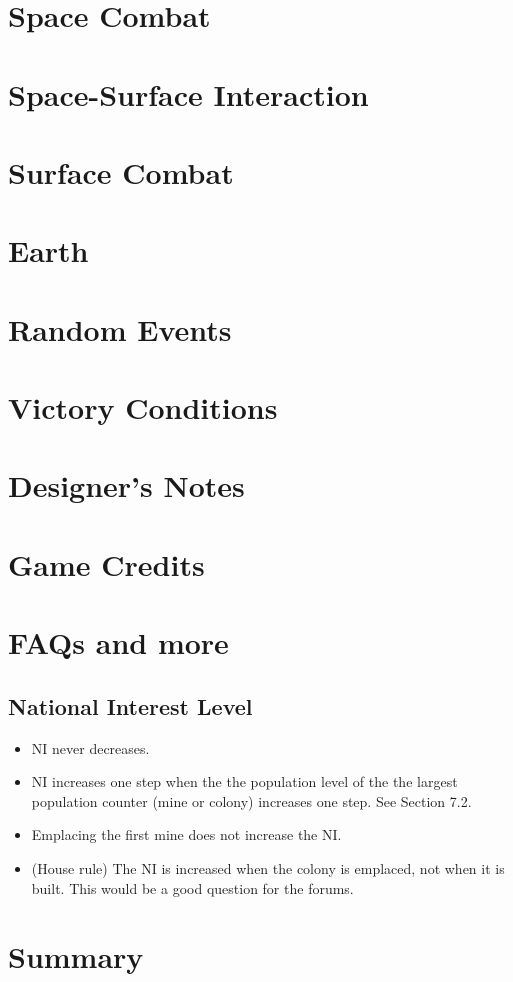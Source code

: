 \documentclass[10pt]{article}
\begin{document}
\begin{multicols}{2}
\section{Space Combat}

\section{Space-Surface Interaction}

\section{Surface Combat}

\section{Earth}

\section{Random Events}

\section{Victory Conditions}

\section{Designer's Notes}

\section{Game Credits}


\section{FAQs and more}

\subsection{National Interest Level}

\begin{itemize}
  \item NI never decreases.
  \item NI increases one step when the the population level of the the largest
    population counter (mine or colony) increases one step. See Section 7.2.
  \item Emplacing the first mine does not increase the NI.
  \item (House rule) The NI is increased when the colony is emplaced, not when
    it is built. This would be a good question for the forums.
\end{itemize}
\section{Summary}

\end{multicols}
\end{document}

